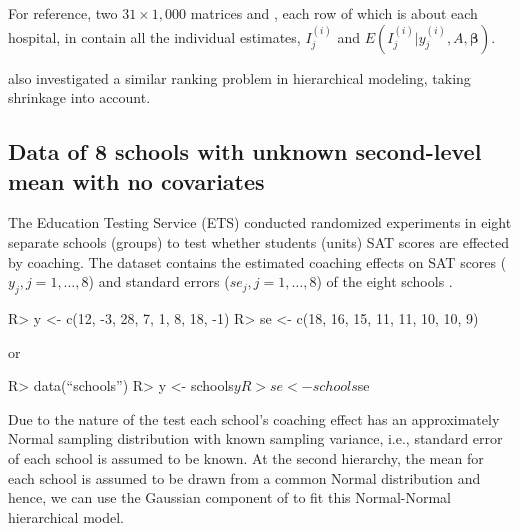 \documentclass[article]{jss}
\begin{document}
For reference, two $31 \times 1,000$ matrices  and , each row of which is about each hospital, in  contain all the individual estimates, $I^{(i)}_{j}$ and $E(I^{(i)}_{j}\vert y^{(i)}_{j}, A, \boldsymbol{\beta})$.

\cite{1995} also investigated a similar ranking problem in hierarchical modeling, taking shrinkage into account.


\subsection[Unknown Second-level Mean and No Covariate]{Data of 8 schools with unknown second-level mean with no covariates} \label{sec:ex:8schools}

The Education Testing Service (ETS) conducted randomized experiments in eight separate schools (groups) to test whether students (units) SAT scores are effected by coaching. The dataset contains the estimated coaching effects on SAT scores ($y_{j}, j=1, \ldots, 8$) and standard errors ($se_{j}, j=1, \ldots, 8$) of the eight schools \citep{1981}.
\begin{CodeChunk}
\begin{CodeInput}
R> y  <- c(12, -3, 28,  7,  1,  8, 18, -1)
R> se <- c(18, 16, 15, 11, 11, 10, 10,  9)
\end{CodeInput}
\end{CodeChunk}
or
\begin{CodeChunk}
\begin{CodeInput}
R> data(``schools'')
R> y  <- schools$y
R> se <- schools$se
\end{CodeInput}
\end{CodeChunk}



Due to the nature of the test each school's coaching effect has an approximately Normal sampling distribution with known sampling variance, i.e., standard error of each school is assumed to be known. At the second hierarchy, the mean for each school is assumed to be drawn from a common Normal distribution and hence, we can use the Gaussian component of  to fit this Normal-Normal hierarchical model.
\end{document}
